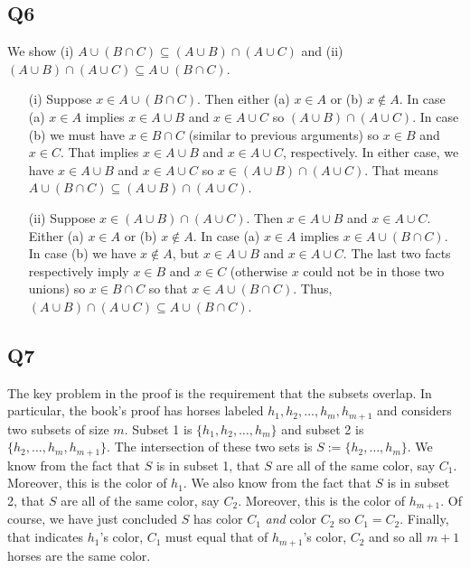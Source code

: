 \documentclass[12pt]{article}
\numberwithin{theorem}{section}
\numberwithin{equation}{section}
\numberwithin{remark}{section}
\numberwithin{definition}{section}
\numberwithin{theorem}{section}
\numberwithin{lemma}{section}
\numberwithin{example}{section}
\begin{document}
\subsection{Q6}

We show (i) $A \cup \left(B \cap C\right) \subseteq \left(A \cup B\right) \cap  \left(A \cup C\right)$ and (ii) $\left(A \cup B\right) \cap  \left(A \cup C\right) \subseteq A \cup \left(B \cap C\right)$.
\begin{itemize}
	\item[(i)]{Suppose $x\in A \cup \left(B \cap C\right)$. Then either (a) $x\in A$ or (b) $x \notin A$. In case (a) $x\in A$ implies $x\in A \cup B$ and $x \in A \cup C$ so $\left(A \cup B\right) \cap  \left(A \cup C\right)$. In case (b) we must have $x\in B \cap C$ (similar to previous arguments) so $x\in B$ and $x\in C$. That implies $x \in A \cup B$ and $x \in A \cup C$, respectively. In either case, we have $x \in A \cup B$ and $x \in A \cup C$ so $x\in \left(A \cup B\right) \cap  \left(A \cup C\right)$. That means $A \cup \left(B \cap C\right) \subseteq \left(A \cup B\right) \cap  \left(A \cup C\right)$.}
	\item[(ii)]{Suppose $x\in \left(A \cup B\right) \cap  \left(A \cup C\right)$. Then $x\in A \cup B$ and $x\in A \cup C$. Either (a) $x\in A$ or (b) $x\notin A$. In case (a) $x\in A$ implies $x\in A \cup \left(B \cap C\right)$. In case (b) we have $x\notin A$, but $x\in A \cup B$ and $x\in A \cup C$. The last two facts respectively imply $x\in B$ and $x\in C$ (otherwise $x$ could not be in those two unions) so $x\in B \cap C$ so that $x \in A \cup \left(B \cap C\right)$. Thus, $\left(A \cup B\right) \cap  \left(A \cup C\right) \subseteq A \cup \left(B \cap C\right)$.}
\end{itemize}



\subsection{Q7}

The key problem in the proof is the requirement that the subsets overlap. In particular, the book's proof has horses labeled $h_1,h_2,\ldots,h_{m},h_{m+1}$ and considers two subsets of size $m$. Subset 1 is $\{h_1,h_2,\ldots,h_m\}$ and subset 2 is $\{h_2,\ldots,h_m,h_{m+1}\}$. The intersection of these two sets is $S:=\{h_2,\ldots,h_m\}$. We know from the fact that $S$ is in subset 1, that $S$ are all of the same color, say $C_1$. Moreover, this is the color of $h_1$. We also know from the fact that $S$ is in subset 2, that $S$ are all of the same color, say $C_2$. Moreover, this is the color of $h_{m+1}$. Of course, we have just concluded $S$ has color $C_1$ \emph{and} color $C_2$ so $C_1=C_2$. Finally, that indicates $h_1$'s color, $C_1$ must equal that of $h_{m+1}$'s color, $C_2$ and so all $m+1$ horses are the same color. 
\end{document}
